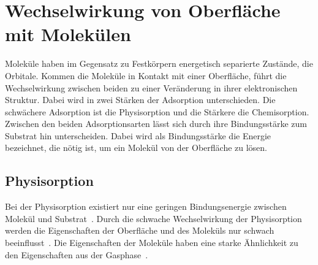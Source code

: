     \section{Wechselwirkung von Oberfläche mit Molekülen} \label{sec:WW}
        Moleküle haben im Gegensatz zu Festkörpern energetisch separierte Zustände, die Orbitale.
        Kommen die Moleküle in Kontakt mit einer Oberfläche, führt die Wechselwirkung zwischen beiden zu einer Veränderung in ihrer elektronischen Struktur.
        Dabei wird in zwei Stärken der Adsorption unterschieden.
        Die schwächere Adsorption ist die Physisorption und die Stärkere die Chemisorption. %
        Zwischen den beiden Adsorptionsarten lässt sich durch ihre Bindungsstärke zum Substrat hin unterscheiden.
        Dabei wird als Bindungsstärke die Energie bezeichnet, die nötig ist, um ein Molekül von der Oberfläche zu lösen.
        
        \subsection{Physisorption}
            Bei der Physisorption existiert nur eine geringen Bindungsenergie zwischen Molekül und Substrat~\cite{IF_16}. 
            Durch die schwache Wechselwirkung der Physisorption werden die Eigenschaften der Oberfläche und des Moleküls nur schwach beeinflusst~\cite{bergenti_spinterface_2019}.
            Die Eigenschaften der Moleküle haben eine starke Ähnlichkeit zu den Eigenschaften aus der Gasphase~\cite{IF_16}.

